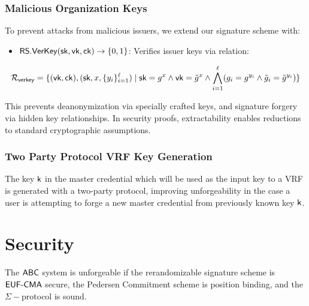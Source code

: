 \subsubsection{Malicious Organization Keys}
To prevent attacks from malicious issuers, we extend our signature scheme with:
\begin{itemize}
    \item $\mathsf{RS.VerKey}(\mathsf{sk}, \mathsf{vk}, \mathsf{ck}) \to \{0,1\}$: Verifies issuer keys via relation:
\end{itemize}
\[
\mathcal{R}_{\mathsf{verkey}} = \{(\mathsf{vk}, \mathsf{ck}),(\mathsf{sk}, x, \{y_i\}_{i=1}^\ell) \mid \mathsf{sk} = g^x \wedge \mathsf{vk} = \tilde{g}^x \wedge \bigwedge_{i=1}^\ell (g_i = g^{y_i} \wedge \tilde{g}_i = \tilde{g}^{y_i})\}
\]

This prevents deanonymization via specially crafted keys, and signature forgery via hidden key relationships. In security proofs, extractability enables reductions to standard cryptographic assumptions.

\subsubsection{Two Party Protocol VRF Key Generation}
The key $\mathsf{k}$ in the master credential which will be used as the input key to a VRF is generated with a two-party protocol, improving unforgeability in the case a user is attempting to forge a new master credential from previously known key $\mathsf{k}$.





\section{Security}
\begin{theorem}[Unforgeability]
The $\mathsf{ABC}$ system is unforgeable if the rerandomizable signature scheme is $\mathsf{EUF\text{-}CMA}$ secure, the Pedersen Commitment scheme is position binding, and the $\Sigma-$protocol is sound.
\end{theorem}

